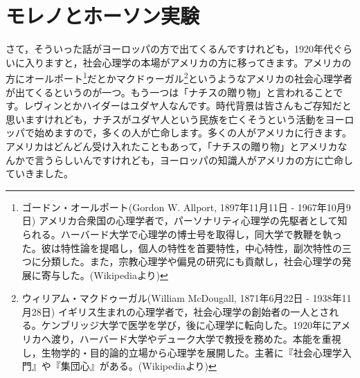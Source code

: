 \documentclass{ltjsbook}
\begin{document}
\section{モレノとホーソン実験}
さて，そういった話がヨーロッパの方で出てくるんですけれども，1920年代ぐらいに入りますと，社会心理学の本場がアメリカの方に移ってきます。アメリカの方にオールポート\footnote{ゴードン・オールポート(Gordon W. Allport, 1897年11月11日 - 1967年10月9日)  アメリカ合衆国の心理学者で，パーソナリティ心理学の先駆者として知られる。ハーバード大学で心理学の博士号を取得し，同大学で教鞭を執った。彼は特性論を提唱し，個人の特性を首要特性，中心特性，副次特性の三つに分類した。また，宗教心理学や偏見の研究にも貢献し，社会心理学の発展に寄与した。(Wikipediaより)}だとかマクドゥーガル\footnote{ウィリアム・マクドゥーガル(William McDougall, 1871年6月22日 - 1938年11月28日)  イギリス生まれの心理学者で，社会心理学の創始者の一人とされる。ケンブリッジ大学で医学を学び，後に心理学に転向した。1920年にアメリカへ渡り，ハーバード大学やデューク大学で教授を務めた。本能を重視し，生物学的・目的論的立場から心理学を展開した。主著に『社会心理学入門』や『集団心』がある。(Wikipediaより)}というようなアメリカの社会心理学者が出てくるというのが一つ。もう一つは「ナチスの贈り物」と言われることです。レヴィンとかハイダーはユダヤ人なんです。時代背景は皆さんもご存知だと思いますけれども，ナチスがユダヤ人という民族を亡くそうという活動をヨーロッパで始めますので，多くの人が亡命します。多くの人がアメリカに行きます。アメリカはどんどん受け入れたこともあって，「ナチスの贈り物」とアメリカなんかで言うらしいんですけれども，ヨーロッパの知識人がアメリカの方に亡命していきました。
\end{document}
